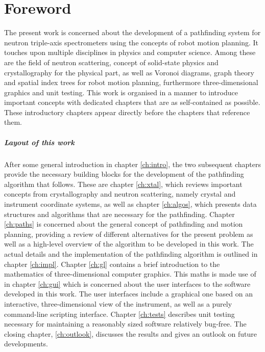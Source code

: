 %
%

\chapter*{Foreword}
The present work is concerned about the development of a pathfinding system for neutron triple-axis
spectrometers using the concepts of robot motion planning.
It touches upon multiple disciplines in physics and computer science. Among these are the field
of neutron scattering, concept of solid-state physics and crystallography for the physical part,
as well as Voronoi diagrams, graph theory and spatial index trees for robot motion 
planning, furthermore three-dimensional graphics and unit testing.
This work is organised in a manner to introduce important concepts with dedicated chapters that are
as self-contained as possible. These introductory chapters appear directly before the chapters that reference
them.

\paragraph{Layout of this work}
After some general introduction in chapter \ref{ch:intro}, the two subsequent chapters 
provide the necessary building blocks for the development of the pathfinding algorithm that follows.
These are chapter \ref{ch:xtal}, which reviews important concepts from crystallography and
neutron scattering, namely crystal and instrument coordinate systems,
as well as chapter \ref{ch:algos}, which presents data structures and algorithms 
that are necessary for the pathfinding.
Chapter \ref{ch:paths} is concerned about the general concept of pathfinding and motion planning, providing
a review of different alternatives for the present problem as well as a high-level overview of the algorithm
to be developed in this work. The actual details and the implementation of the pathfinding algorithm
is outlined in chapter \ref{ch:impl}.
Chapter \ref{ch:gl} contains a brief introduction to the mathematics of three-dimensional computer graphics.
This maths is made use of in chapter \ref{ch:gui} which is concerned about the user interfaces to the software
developed in this work. The user interfaces include a graphical one based on an interactive, three-dimensional
view of the instrument, as well as a purely command-line scripting interface.
Chapter \ref{ch:tests} describes unit testing necessary for maintaining
a reasonably sized software relatively bug-free.
The closing chapter, \ref{ch:outlook}, discusses the results and gives an outlook 
on future developments.

